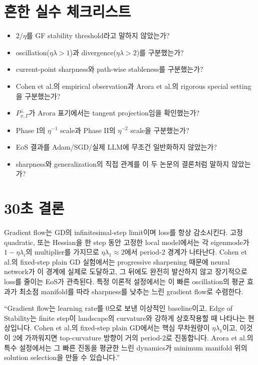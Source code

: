 \documentclass[11pt,a4paper,oneside,openany]{memoir}
\theoremstyle{definition}
\begin{document}
\section{흔한 실수 체크리스트}

\begin{itemize}
  \item[$\square$] $2/\eta$를 GF stability threshold라고 말하지 않았는가? 
  \item[$\square$] oscillation($\eta\lambda>1$)과 divergence($\eta\lambda>2$)를 구분했는가?
  \item[$\square$] current-point sharpness와 path-wise stableness를 구분했는가?
  \item[$\square$] Cohen et al.의 empirical observation과 Arora et al.의 rigorous special setting을 구분했는가?
  \item[$\square$] $P^\perp_{x,\Gamma}$가 Arora 표기에서는 tangent projection임을 확인했는가?
  \item[$\square$] Phase I의 $\eta^{-1}$ scale과 Phase II의 $\eta^{-2}$ scale을 구분했는가?
  \item[$\square$] EoS 결과를 Adam/SGD/실제 LLM에 무조건 일반화하지 않았는가?
  \item[$\square$] sharpness와 generalization의 직접 관계를 이 두 논문의 결론처럼 말하지 않았는가?
\end{itemize}

\section{30초 결론}

\begin{keybox}
Gradient flow는 GD의 infinitesimal-step limit이며 loss를 항상 감소시킨다.
고정 quadratic, 또는 Hessian을 한 step 동안 고정한 local model에서는 각 eigenmode가
$1-\eta\lambda_i$의 multiplier를 가지므로 $\eta\lambda_1\approx2$에서 period-2 경계가 나타난다.
Cohen et al.의 fixed-step plain GD 실험에서는 progressive sharpening 때문에 neural network가 이 경계에 실제로 도달하고,
그 뒤에도 완전히 발산하지 않고 장기적으로 loss를 줄이는 EoS가 관측된다.
특정 이론적 설정에서는 이 빠른 oscillation의 평균 효과가 최소점 manifold를 따라
sharpness를 낮추는 느린 gradient flow로 수렴한다.
\end{keybox}

\begin{presentbox}
``Gradient flow는 learning rate를 0으로 보낸 이상적인 baseline이고, Edge of Stability는 finite step이 landscape의 curvature와 강하게 상호작용할 때 나타나는 현상입니다.
Cohen et al.의 fixed-step plain GD에서는 핵심 무차원량이 $\eta\lambda_1$이고, 이것이 2에 가까워지면 top-curvature 방향이 거의 period-2로 진동합니다.
Arora et al.의 특수 설정에서는 그 빠른 진동을 평균한 느린 dynamics가 minimum manifold 위의 solution selection을 만들 수 있습니다.''
\end{presentbox}
\end{document}
